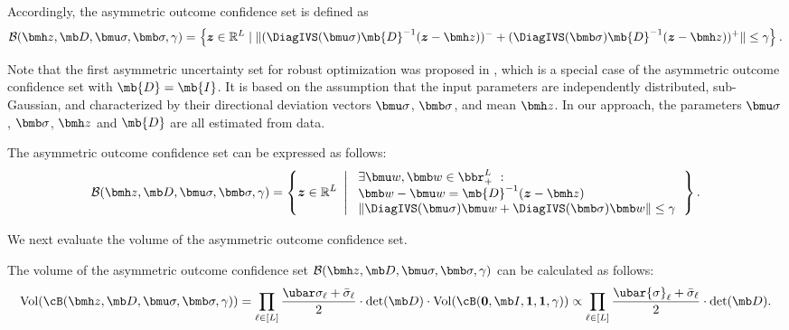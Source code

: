 \documentclass[mnsc, nonblindrev]{informswp}
\newcommand{\1}[1]{\mathds{1}{\left(#1\right)}}
\begin{document}
Accordingly, the asymmetric outcome confidence set is defined as
\begin{equation}
\label{eq:AsymmetricRegion}
\mathcal{B}(\bmh z, \mb D, \bmu \sigma, \bmb \sigma, \gamma) = \left\{ \bm z \in \mathbb{R}^L \;|\; \|(\DiagIVS(\bmu \sigma) \mb{D}^{-1} (\bm z-\bmh z))^- +  (\DiagIVS(\bmb \sigma) \mb{D}^{-1} (\bm z-\bmh z))^+\| \leq \gamma \right\}.
\end{equation}

Note that the first asymmetric uncertainty set for robust optimization was proposed in \cite{chen2007robust}, which is a special case of the asymmetric outcome confidence set with $\mb{D} = \mb{I}$. It is based on the assumption that the input parameters are independently distributed, sub-Gaussian, and characterized by their directional deviation vectors $\bmu \sigma$, $\bmb \sigma$, and mean $\bmh z$.  In our approach, the parameters $\bmu \sigma$, $\bmb \sigma$, $\bmh z$ and $\mb{D}$ are all estimated from data.

\begin{theorem}
\label{thm:AsymmetricRegion2}
The asymmetric outcome confidence set can be expressed as follows:
\begin{equation}
\label{eq:AsymmetricRegion2}
\mathcal{B}(\bmh z, \mb D, \bmu \sigma, \bmb \sigma, \gamma) = \left\{ \bm z \in \mathbb{R}^L ~\left|~ 
\begin{array}{l}
\exists \bmu w,\bmb w \in \bbr^L_+~:~ \\
\bmb w  -  \bmu w   =  \mb{D}^{-1} (\bm z - \bmh  z) \\
\|\DiagIVS(\bmu \sigma) \bmu w + \DiagIVS(\bmb \sigma) \bmb w\|\leq \gamma 
\end{array}
\right.
\right\}.
\end{equation}
\end{theorem}

We next evaluate the volume of the asymmetric outcome confidence set.
\begin{theorem}
\label{thm:asymmetricalvolume}
The volume of the asymmetric outcome confidence set $\mathcal{B}(\bmh z, \mb D, \bmu \sigma, \bmb \sigma, \gamma)$ can be calculated as follows:
$$
\mathrm{Vol}(\cB(\bmh z, \mb D, \bmu \sigma, \bmb \sigma , \gamma)) = \prod_{\ell \in [L]} \frac{\ubar \sigma_{\ell} + \bar \sigma_{\ell}}{2} \cdot \det(\mb D) \cdot \mathrm{Vol}(\cB(\bm 0, \mb I, \bm 1,\bm 1,\gamma)) \propto \displaystyle \prod_{\ell \in [L]} \frac{\ubar{\sigma}_{\ell} + \bar{\sigma}_{\ell}}{2} \cdot \det(\mb D).
$$
\end{theorem}
\end{document}
